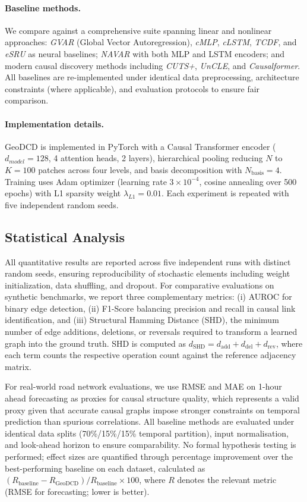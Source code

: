 \documentclass{article}
\begin{document}
\paragraph{Baseline methods.}
We compare against a comprehensive suite spanning linear and nonlinear approaches: \textit{GVAR} (Global Vector Autoregression), \textit{cMLP}, \textit{cLSTM}, \textit{TCDF}, and \textit{eSRU} as neural baselines; \textit{NAVAR} with both MLP and LSTM encoders; and modern causal discovery methods including \textit{CUTS+}, \textit{UnCLE}, and \textit{Causalformer}. All baselines are re-implemented under identical data preprocessing, architecture constraints (where applicable), and evaluation protocols to ensure fair comparison.

\paragraph{Implementation details.}
GeoDCD is implemented in PyTorch with a Causal Transformer encoder ($d_{model}=128$, 4 attention heads, 2 layers), hierarchical pooling reducing $N$ to $K=100$ patches across four levels, and basis decomposition with $N_{\mathrm{basis}}=4$. Training uses Adam optimizer (learning rate $3\times 10^{-4}$, cosine annealing over 500 epochs) with L1 sparsity weight $\lambda_{L1}=0.01$. Each experiment is repeated with five independent random seeds.

\subsection{Statistical Analysis}
All quantitative results are reported across five independent runs with distinct random seeds, ensuring reproducibility of stochastic elements including weight initialization, data shuffling, and dropout. For comparative evaluations on synthetic benchmarks, we report three complementary metrics: (i) AUROC for binary edge detection, (ii) F1-Score balancing precision and recall in causal link identification, and (iii) Structural Hamming Distance (SHD), the minimum number of edge additions, deletions, or reversals required to transform a learned graph into the ground truth. SHD is computed as $d_{\mathrm{SHD}} = d_{\mathrm{add}} + d_{\mathrm{del}} + d_{\mathrm{rev}}$, where each term counts the respective operation count against the reference adjacency matrix.

For real-world road network evaluations, we use RMSE and MAE on 1-hour ahead forecasting as proxies for causal structure quality, which represents a valid proxy given that accurate causal graphs impose stronger constraints on temporal prediction than spurious correlations. All baseline methods are evaluated under identical data splits (70\%/15\%/15\% temporal partition), input normalisation, and look-ahead horizon to ensure comparability. No formal hypothesis testing is performed; effect sizes are quantified through percentage improvement over the best-performing baseline on each dataset, calculated as $(R_{\mathrm{baseline}} - R_{\mathrm{GeoDCD}}) / R_{\mathrm{baseline}} \times 100$, where $R$ denotes the relevant metric (RMSE for forecasting; lower is better).
\end{document}
